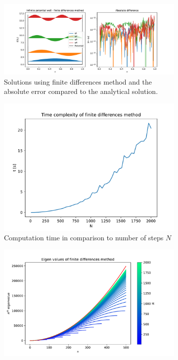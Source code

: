 \documentclass[12pt, a4paper]{article}
\begin{document}
\begin{figure}[hbtp]
  \begin{subfigure}{\textwidth}
  \includegraphics[width=\linewidth]{differences_infinite.pdf}
  \caption{Solutions using finite differences method and the absolute error compared to the analytical solution.} \label{fig:e}
  \end{subfigure}
  \medskip
  \begin{subfigure}{0.5\textwidth}
  \includegraphics[width=\linewidth]{time_diff.pdf}
  \caption{Computation time in comparison to number of steps $N$} \label{fig:a}
  \end{subfigure}
  \begin{subfigure}{0.5\textwidth}
  \includegraphics[width=\linewidth]{eigen_diff.pdf}

\end{subfigure}
\end{figure}
\end{document}
